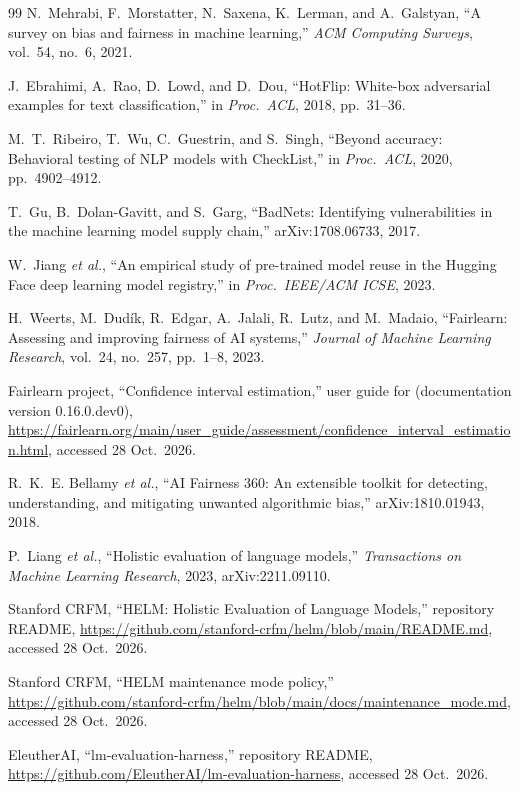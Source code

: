 \begin{thebibliography}{99}
 N.~Mehrabi, F.~Morstatter, N.~Saxena, K.~Lerman, and A.~Galstyan, ``A survey on bias and fairness in machine learning,'' \emph{ACM Computing Surveys}, vol.~54, no.~6, 2021.

 J.~Ebrahimi, A.~Rao, D.~Lowd, and D.~Dou, ``HotFlip: White-box adversarial examples for text classification,'' in \emph{Proc.\ ACL}, 2018, pp.~31--36.

 M.~T.~Ribeiro, T.~Wu, C.~Guestrin, and S.~Singh, ``Beyond accuracy: Behavioral testing of NLP models with CheckList,'' in \emph{Proc.\ ACL}, 2020, pp.~4902--4912.

 T.~Gu, B.~Dolan-Gavitt, and S.~Garg, ``BadNets: Identifying vulnerabilities in the machine learning model supply chain,'' arXiv:1708.06733, 2017.

 W.~Jiang \emph{et al.}, ``An empirical study of pre-trained model reuse in the Hugging Face deep learning model registry,'' in \emph{Proc.\ IEEE/ACM ICSE}, 2023.

 H.~Weerts, M.~Dud\'ik, R.~Edgar, A.~Jalali, R.~Lutz, and M.~Madaio, ``Fairlearn: Assessing and improving fairness of AI systems,'' \emph{Journal of Machine Learning Research}, vol.~24, no.~257, pp.~1--8, 2023.

 Fairlearn project, ``Confidence interval estimation,'' user guide for  (documentation version 0.16.0.dev0), \url{https://fairlearn.org/main/user_guide/assessment/confidence_interval_estimation.html}, accessed 28 Oct.\ 2026.

 R.~K.~E. Bellamy \emph{et al.}, ``AI Fairness 360: An extensible toolkit for detecting, understanding, and mitigating unwanted algorithmic bias,'' arXiv:1810.01943, 2018.

 P.~Liang \emph{et al.}, ``Holistic evaluation of language models,'' \emph{Transactions on Machine Learning Research}, 2023, arXiv:2211.09110.

 Stanford CRFM, ``HELM: Holistic Evaluation of Language Models,'' repository README, \url{https://github.com/stanford-crfm/helm/blob/main/README.md}, accessed 28 Oct.\ 2026.

 Stanford CRFM, ``HELM maintenance mode policy,'' \url{https://github.com/stanford-crfm/helm/blob/main/docs/maintenance_mode.md}, accessed 28 Oct.\ 2026.

 EleutherAI, ``lm-evaluation-harness,'' repository README, \url{https://github.com/EleutherAI/lm-evaluation-harness}, accessed 28 Oct.\ 2026.


\end{thebibliography}
